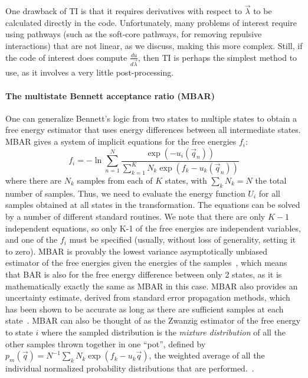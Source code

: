 \documentclass[9pt,bestpractices]{livecoms}
\begin{document}
%
One drawback of TI is that it requires derivatives with respect to $\vec{\lambda}$ to be calculated directly in the code. Unfortunately, many problems of interest require using pathways (such as the soft-core pathways, for removing repulsive interactions) that are not linear, as we discuss, making this more complex. Still, if the code of interest does compute $\frac{du}{d\vec{\lambda}}$, then TI is perhaps the simplest method to use, as it involves a very little post-processing.
%
\paragraph{The multistate Bennett acceptance ratio (MBAR)}
One can generalize Bennett's logic from two states to multiple states to obtain a free energy estimator that uses energy differences between all intermediate states. MBAR gives a system of implicit equations for the free energies $f_i$:
\begin{equation}
f_i = - \ln \sum_{n=1}^{N} \frac{\exp(-u_i(\vec{q}_n))}{\sum_{k=1}^K N_k \exp(f_k-u_k(\vec{q}_n))}
\end{equation}
where there are $N_k$ samples from each of $K$ states, with $\sum_k N_k=N$ the total number of samples. Thus, we need to evaluate the energy function $U_i$ for all samples obtained at all states in the transformation. The equations can be solved by a number of different standard routines. We note that there are only $K-1$ independent equations, so only K-1 of the free energies are independent variables, and one of the $f_i$ must be specified (usually, without loss of generality, setting it to zero).
%
MBAR is provably the lowest variance asymptotically unbiased estimator of the free energies given the energies of the samples~\cite{tan2004likelihood}, which means that BAR is also for the free energy difference between only 2 states, as it is mathematically exactly the same as MBAR in this case. MBAR also provides an uncertainty estimate, derived from standard error propagation methods, which has been shown to be accurate as long as there are sufficient samples at each state~\cite{paliwal2011benchmark}.
%
MBAR can also be thought of as the Zwanzig estimator of the free energy to state $i$ where the sampled distribution is the \textit{mixture distribution} of all the other samples thrown together in one ``pot'', defined by $p_m(\vec{q}) = N^{-1} \sum_k  N_k \exp(f_k-u_k\vec{q})$, the weighted average of all the individual normalized probability distributions that are performed.~\cite{shirts2017reweighting}.
%
\end{document}
